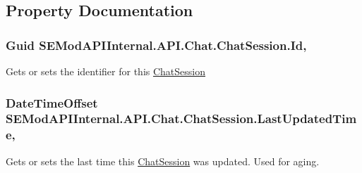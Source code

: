\subsection{Property Documentation}
\hypertarget{class_s_e_mod_a_p_i_internal_1_1_a_p_i_1_1_chat_1_1_chat_session_a4dff80dea4ea97582682ac2d1e8642de}{}
\subsubsection[{Id}]{\setlength{\rightskip}{0pt plus 5cm}Guid S\+E\+Mod\+A\+P\+I\+Internal.\+A\+P\+I.\+Chat.\+Chat\+Session.\+Id\hspace{0.3cm}{\ttfamily [get]}, {\ttfamily [set]}}\label{class_s_e_mod_a_p_i_internal_1_1_a_p_i_1_1_chat_1_1_chat_session_a4dff80dea4ea97582682ac2d1e8642de}


Gets or sets the identifier for this \hyperlink{class_s_e_mod_a_p_i_internal_1_1_a_p_i_1_1_chat_1_1_chat_session}{Chat\+Session} 

\hypertarget{class_s_e_mod_a_p_i_internal_1_1_a_p_i_1_1_chat_1_1_chat_session_a1dd4281e965d6288cfcd589c02c36451}{}
\subsubsection[{Last\+Updated\+Time}]{\setlength{\rightskip}{0pt plus 5cm}Date\+Time\+Offset S\+E\+Mod\+A\+P\+I\+Internal.\+A\+P\+I.\+Chat.\+Chat\+Session.\+Last\+Updated\+Time\hspace{0.3cm}{\ttfamily [get]}, {\ttfamily [set]}}\label{class_s_e_mod_a_p_i_internal_1_1_a_p_i_1_1_chat_1_1_chat_session_a1dd4281e965d6288cfcd589c02c36451}


Gets or sets the last time this \hyperlink{class_s_e_mod_a_p_i_internal_1_1_a_p_i_1_1_chat_1_1_chat_session}{Chat\+Session} was updated. Used for aging. 

